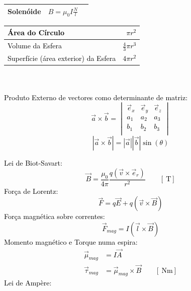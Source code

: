 \documentclass[a4paper,10pt]{extarticle} %
\newcommand{\mybox}[2]{
    \begin{tcolorbox}[colback=lightblue!5!white,colframe=lightblue!75!black,boxsep=1pt,arc=0pt,outer arc=0pt,title={\textcolor{black}{#1}}]
        \textcolor{black}{#2}
    \end{tcolorbox}
}
\begin{document}
\begin{multicols}{2}
{\begin{tabular}{||l|ll||}
        \hline Solenóide  & \( B = \mu_0 I \frac{N}{l}\)&\\ 
        \hline
    \end{tabular}
}
\mybox{Geometria e Produto Externo}{
    \begin{tabular}{||l|r||}
        \hline Área do Círculo & \( \pi r^2\) \\
        \hline Volume da Esfera & \( \frac{4}{3} \pi r^3\) \\
        \hline Superfície (área exterior) da Esfera & \( 4 \pi r^2\) \\
        \hline
    \end{tabular}\\ 
    \\Produto Externo de vectores como determinante de matriz:
    \begin{equation*}
    \vec{a} \times \vec{b} = \begin{vmatrix}
        \vec{e}_x & \vec{e}_y & \vec{e}_z \\
        a_1 & a_2 & a_3 \\
        b_1 & b_2 & b_3 \\
    \end{vmatrix}
    \end{equation*}
    \begin{equation*}
        |\vec{a} \times \vec{b}| = |\vec{a}| |\vec{b}| \sin(\theta)
    \end{equation*}
}
\mybox{Campo de Indução Magnética $\vec{B}$}{
    Lei de Biot-Savart:
    \begin{equation}
        \vec{B} = \frac{\mu_0}{4 \pi} \frac{q (\vec{v} \times \vec{e}_r) }{r^2} \qquad [\SI{}{\tesla}]
    \end{equation}
    Força de Lorentz:
    \begin{equation}
        \vec{F} = q  \vec{E}  + q \left( \vec{v} \times \vec{B} \right)
    \end{equation}
    Força magnética sobre correntes:
    \begin{equation}
        \vec{F}_{mag} = I \left( \vec{l} \times \vec{B}\right) 
    \end{equation}
    Momento magnético e Torque numa espira:
    \begin{align}
        \vec{\mu}_{mag} &= I  \vec{A}\\
        \vec{\tau}_{mag} &=  \vec{\mu}_{mag} \times \vec{B} \qquad [\SI{}{\newton\meter}]
    \end{align}
    Lei de Ampère:
    \begin{equation}

\end{equation}}
\end{multicols}
\end{document}

